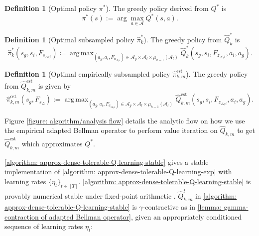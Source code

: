 \documentclass{article}
\theoremstyle{plain}
\theoremstyle{definition}
\newtheorem{definition}[theorem]{Definition}
\def\est{\mathrm{est}}
\DeclareMathOperator*{\argmax}{arg\,max}
\begin{document}
\begin{definition}[Optimal policy $\pi^*$] The greedy policy derived from $Q^*$ is \begin{equation}\pi^*(s) := \arg\max_{a\in\mathcal{A}} Q^*(s,a).\end{equation}
\end{definition}
\begin{definition}[Optimal subsampled policy $\hat{\pi}_k^*$]
    The greedy policy from $\hat{Q}_k^*$ is
\begin{equation}\hat{\pi}_k^*(s_g,s_i,F_{s_{\Delta\setminus i}}) \coloneq \mathop{\argmax}_{(a_g,a_i,F_{a_{\Delta\setminus i}})\in\mathcal{A}_g\times\mathcal{A}_l\times \mu_{k-1}{(\mathcal{A}_l)}} \hat{Q}_k^*(s_g,s_i,F_{z_{\Delta\setminus i}},a_i,a_g).\end{equation}
\end{definition}
\begin{definition}[Optimal empirically subsampled policy $\hat{\pi}_{k,m}^\est$]
    The greedy policy from $\hat{Q}_{k,m}^\est$ is given by \begin{equation}\hat{\pi}_{k,m}^\est(s_g,F_{s_\Delta}):=\mathop{\argmax}_{(a_g,a_i,F_{a_{\Delta\setminus i}})\in\mathcal{A}_g\times\mathcal{A}_l\times \mu_{k-1}{(\mathcal{A}_l)}}\hat{Q}_{k,m}^\est(s_g,s_i,F_{z_{\Delta\setminus i}},a_i,a_g).\end{equation}
\end{definition}

Figure \ref{figure: algorithm/analysis flow} details the analytic flow on how we use the empirical adapted Bellman operator to perform value iteration on $\hat{Q}_{k,m}$ to get $\hat{Q}_{k,m}^\est$ which approximates $Q^*$.

\cref{algorithm: approx-dense-tolerable-Q-learning-stable} gives a stable implementation of \cref{algorithm: approx-dense-tolerable-Q-learning-exp} with learning rates $\{\eta_t\}_{t\in[T]}$. \cref{algorithm: approx-dense-tolerable-Q-learning-stable} is provably numerical stable under fixed-point arithmetic \citep{anand_et_al:LIPIcs.ICALP.2024.10,anand2025structural}. $\hat{Q}_{k,m}^t$ in \cref{algorithm: approx-dense-tolerable-Q-learning-stable} is $\gamma$-contractive as in \cref{lemma: gamma-contraction of adapted Bellman operator}, given an appropriately conditioned sequence of learning rates $\eta_t$:
\end{document}
